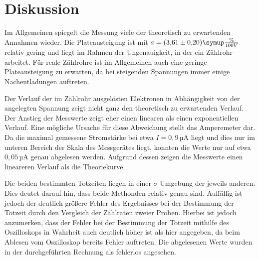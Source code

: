 \section{Diskussion}
\label{sec:Diskussion}

Im Allgemeinen spiegelt die Messung viele der theoretisch zu erwartenden Annahmen
wieder. Die Plateausteigung ist mit $a=(3{,}61 \pm 0{,}20) \symup{\frac{\%}{100V}}$
relativ gering und liegt im Rahmen der Ungenauigkeit, in der ein Zählrohr arbeitet.
Für reale Zählrohre ist im Allgemeinen auch eine geringe Plateausteigung zu erwarten,
da bei steigenden Spannungen immer einige Nachentladungen auftreten.

Der Verlauf der im Zählrohr ausgelösten Elektronen in Abhängigkeit von der angelegten
Spannung zeigt nicht ganz den theoretisch zu erwartenden Verlauf. Der Anstieg
der Messwerte zeigt eher einen linearen als einen exponentiellen Verlauf. Eine
mögliche Ursache für diese Abweichung stellt das Amperemeter dar. Da die maximal
gemessene Stromstärke bei etwa $I=0{,}9\,$µA liegt und dies nur im unteren Bereich
der Skala des Messgerätes liegt, konnten die Werte nur auf etwa $0{,}05\,$µA genau
abgelesen werden. Aufgrund dessen zeigen die Messwerte einen lineareren Verlauf
als die Theoriekurve.

Die beiden bestimmten Totzeiten liegen in einer $\sigma$ Umgebung der jeweils
anderen. Dies deutet darauf hin, dass beide Methonden relativ genau sind. Auffällig
ist jedoch der deutlich größere Fehler des Ergebnisses bei der Bestimmung der Totzeit
durch den Vergleich der Zählraten zweier Proben. Hierbei ist jedoch anzumerken,
dass der Fehler bei der Bestimmung der Totzeit mithilfe des Oszilloskops in Wahrheit
auch deutlich höher ist als hier angegeben, da beim Ablesen vom Oszilloskop bereits
Fehler auftreten. Die abgelesenen Werte wurden in der durchgeführten Rechnung als
fehlerlos angesehen.
